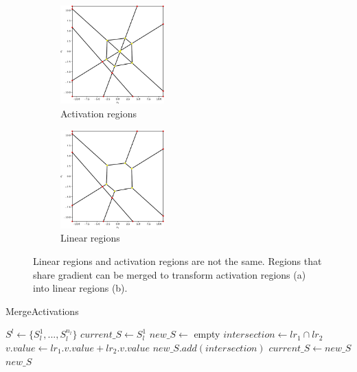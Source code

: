 \documentclass{article}
\begin{document}
\begin{figure}[t]
    \begin{subfigure}{4cm}
        \centering
        \includegraphics[width=4cm]{Figures/activation_regions.pdf}
        \caption{Activation regions}
        \label{fig:activation_regions}
    \end{subfigure}
    \begin{subfigure}{4cm}
        \centering
        \includegraphics[width=4cm]{Figures/linear_regions.pdf}
        \caption{Linear regions}
        \label{fig:linear_regions}
    \end{subfigure}
    \caption{Linear regions and activation regions are not the same. Regions that share gradient can be merged to transform activation regions (a) into linear regions (b).}
    \label{fig:activation_vs_linear_regions}
\end{figure}

\begin{algorithm}
    \caption{MergeActivations}\label{alg:merge_activations}
    \begin{algorithmic}
        \Require $S^l \gets \{S_l^1, ..., S_l^{n_l}\}$  
        \State $current\_S \gets S_l^1$
            \State $new\_S \gets$ empty
                \State $intersection \gets lr_1 \cap lr_2$
                        \State $v.value \gets lr_1.v.value + lr_2.v.value$
                    \EndFor
                    \State $new\_S.add(intersection)$
                \EndIf
            \EndFor
            \State $current\_S \gets new\_S$
        \EndFor
        \State \Return $new\_S$
    \end{algorithmic}
\end{algorithm}
\end{document}
